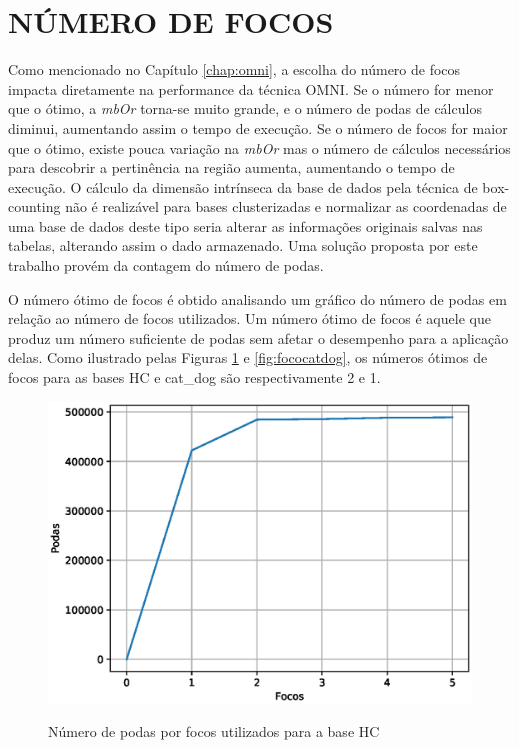 \section{NÚMERO DE FOCOS}
Como mencionado no Capítulo \ref{chap:omni}, a escolha do número de focos impacta diretamente na performance da técnica OMNI. Se o número for menor que o ótimo, a \textit{mbOr} torna-se
muito grande, e o número de podas de cálculos diminui, aumentando assim o tempo de execução. Se o número de focos for maior que o ótimo, existe pouca variação na \textit{mbOr} mas o número de cálculos necessários para
descobrir a pertinência na região aumenta, aumentando o tempo de execução. O cálculo da dimensão intrínseca da base de dados pela técnica de box-counting não é realizável para bases
clusterizadas \cite{Mo2012} e normalizar as coordenadas de uma base de dados deste tipo seria alterar as informações originais salvas nas tabelas, alterando assim o dado armazenado. Uma solução
proposta por este trabalho provém da contagem do número de podas.

O número ótimo de focos é obtido analisando um gráfico do número de podas em relação ao número de focos utilizados. Um número ótimo de focos é aquele que produz um número suficiente de podas sem afetar o desempenho para a aplicação delas.
Como ilustrado pelas Figuras \ref{fig:focoHC} e \ref{fig:fococatdog}, os números ótimos de focos para as bases HC e cat\_dog são respectivamente 2 e 1.



\begin{figure}[H]
\centering
\caption{Número de podas por focos utilizados para a base HC}
\includegraphics[width=.6\textwidth]{dados/figuras/focoHC.eps}
\label{fig:focoHC}
\end{figure}

